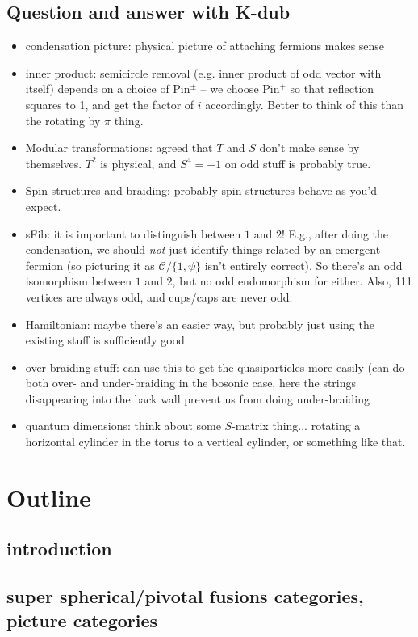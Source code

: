 \documentclass[12pt,a4paper]{article}
\newcommand{\mcc}{\mathcal{C}}
\begin{document}
\subsection{Question and answer with K-dub}
\begin{itemize}
    \item condensation picture: physical picture of attaching fermions makes sense
    \item inner product: semicircle removal (e.g. inner product of odd vector with itself) depends on a choice of Pin$^{\pm}$ -- we choose Pin$^+$ so that reflection squares to 1, and get the factor of $i$ accordingly. Better to think of this than the rotating by $\pi$ thing.
    \item Modular transformations: agreed that $T$ and $S$ don't make sense by themselves. $T^2$ is physical, and $S^4 = -1$ on odd stuff is probably true.
    \item Spin structures and braiding: probably spin structures behave as you'd expect.
    \item sFib: it is important to distinguish between $1$ and $2$! E.g., after doing the condensation, we should {\it not} just identify things related by an emergent fermion (so picturing it as $\mcc / \{1,\psi\}$ isn't entirely correct). So there's an odd isomorphism between $1$ and $2$, but no odd endomorphism for either. Also, 111 vertices are always odd, and cups/caps are never odd. 
    \item Hamiltonian: maybe there's an easier way, but probably just using the existing stuff is sufficiently good
    \item over-braiding stuff: can use this to get the quasiparticles more easily (can do both over- and under-braiding in the bosonic case, here the strings disappearing into the back wall prevent us from doing under-braiding
    \item quantum dimensions: think about some $S$-matrix thing... rotating a horizontal cylinder in the torus to a vertical cylinder, or something like that. 
\end{itemize}

\section{Outline}
\subsection{introduction}
\subsection{super spherical/pivotal fusions categories, picture categories}
\end{document}
